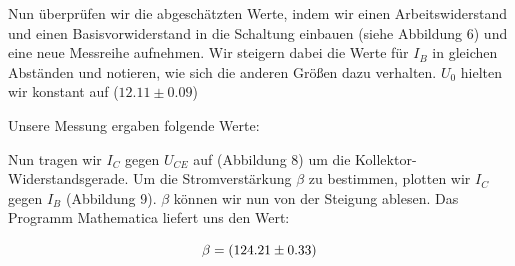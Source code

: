 \begin{center}
\begin{minipage}{\linewidth}
\centering
{}
%
\label{Schaltplan2}
\end{minipage}
\end{center}

Nun überprüfen wir die abgeschätzten Werte, indem wir einen Arbeitswiderstand und einen Basisvorwiderstand in die Schaltung einbauen (siehe Abbildung 6) und eine neue Messreihe aufnehmen. Wir steigern dabei die Werte für \(I_B\) in gleichen Abständen und notieren, wie sich die anderen Größen dazu verhalten. \(U_0\) hielten wir konstant auf (\(12.11\pm 0.09\))

Unsere Messung ergaben folgende Werte:\\

\begin{center}

\end{center}

Nun tragen wir \(I_C\) gegen \(U_{CE}\) auf (Abbildung 8) um die Kollektor-Widerstandsgerade. Um die Stromverstärkung \(\beta\) zu bestimmen, plotten wir \(I_C\) gegen \(I_B\) (Abbildung 9). \(\beta\) können wir nun von der Steigung ablesen. Das Programm Mathematica liefert uns den Wert:

\begin{equation}
\notag
\beta= (124.21\pm 0.33) 
\end{equation}


